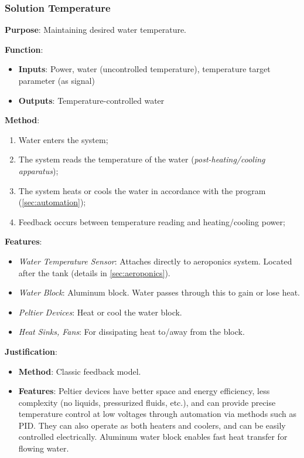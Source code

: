 \documentclass{report}
\begin{document}
\newpage

\subsubsection{Solution Temperature}
\label{sec:watertemp}

\textbf{Purpose}: Maintaining desired water temperature.

\textbf{Function}: 
\begin{itemize}
    \item \textbf{Inputs}: Power, water (uncontrolled temperature), temperature target parameter (as signal)
    \item \textbf{Outputs}: Temperature-controlled water
\end{itemize}

\textbf{Method}:
\begin{enumerate}
    \item Water enters the system;
    \item The system reads the temperature of the water (\textit{post-heating/cooling apparatus});
    \item The system heats or cools the water in accordance with the program (\ref{sec:automation});
    \item Feedback occurs between temperature reading and heating/cooling power;
\end{enumerate}

\textbf{Features}:
\begin{itemize}
    \item \textit{Water Temperature Sensor}: Attaches directly to aeroponics system. Located after the tank (details in \ref{sec:aeroponics}).
    \item \textit{Water Block}: Aluminum block. Water passes through this to gain or lose heat.
    \item \textit{Peltier Devices}: Heat or cool the water block.
    \item \textit{Heat Sinks, Fans}: For dissipating heat to/away from the block.
\end{itemize}

\textbf{Justification}:
\begin{itemize}
    \item \textbf{Method}: Classic feedback model.
    \item \textbf{Features}: Peltier devices have better space and energy efficiency, less complexity (no liquids, pressurized fluids, etc.), and can provide precise temperature control at low voltages through automation via methods such as PID. They can also operate as both heaters and coolers, and can be easily controlled electrically. Aluminum water block enables fast heat transfer for flowing water.
\end{itemize}
\end{document}
